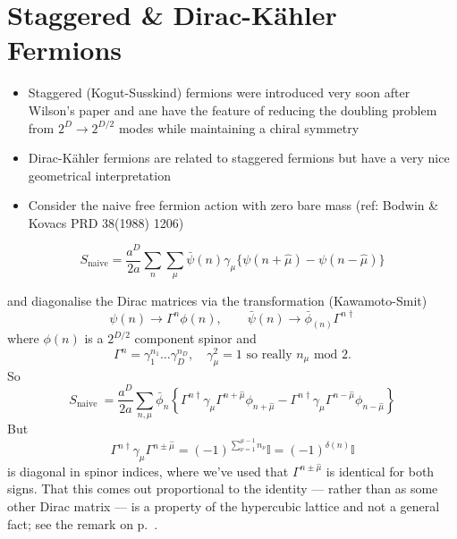 \section{Staggered \& Dirac-K\"ahler Fermions}

\begin{itemize}
  \item Staggered (Kogut-Susskind) fermions were introduced very soon after Wilson's paper and ane have the feature of reducing the doubling problem from \(2^{D} \rightarrow 2^{D / 2}\) modes while maintaining a chiral symmetry
  \item Dirac-Kähler fermions are related to staggered fermions but have a very nice geometrical interpretation
  \item Consider the naive free fermion action with zero bare mass  (ref: Bodwin \& Kovacs PRD 38(1988) 1206)
\end{itemize}

\begin{equation}
S_{\text{naive}}=\frac{a^{D}}{2 a} \sum_{n} \sum_{\mu} \bar{\psi}({n}) \gamma_{\mu}\{\psi(n+\hat{\mu})-\psi(n-\hat{\mu})\}
\end{equation}

and diagonalise the Dirac matrices via the transformation (Kawamoto-Smit)
\begin{equation}
\psi({n}) \rightarrow \Gamma^{n} \phi({n}),
\qquad \bar{\psi}({n}) \rightarrow \bar{\phi}_({n}) \Gamma^{n \dagger} 
\end{equation}
where $\phi({n})$ is a $2^{D / 2}$ component spinor  and
\begin{equation}
    \Gamma^n = \gamma_1^{n_1}\ldots \gamma_D^{n_D}, \quad \gamma^2_\mu = 1 \text{ so really }n_\mu \text{ mod }2.
\end{equation}
So
\begin{equation}
S_{\text {naive }} =\frac{a^{D}}{2 a} \sum_{n,\mu} \bar{\phi}_{n}\left\{\Gamma^{n \dagger} \gamma_{\mu} \Gamma^{n+\hat{\mu}} \phi_{n+\hat{\mu}}-\Gamma^{n \dagger} \gamma_{\mu} \Gamma^{n-\hat{\mu}} \phi_{n-\hat{\mu}}\right\}
\end{equation}
But
\begin{equation}
    \Gamma^{n \dagger} \gamma_\mu \Gamma^{n \pm \hat{\mu}} = (-1)^{\sum_{\nu = 1}^{\mu - 1}n_\nu} \mathbb{I} = (-1)^{\delta(n)}\mathbb{I}
\end{equation}
is diagonal in spinor indices, where we've used that $\Gamma^{n \pm \hat{\mu}}$ is identical for both signs.
That this comes out proportional to the identity --- rather than as some other
Dirac matrix --- is a property of the hypercubic lattice and not a general fact;
see the remark on p.~\pageref{rmk:kd-cubic}.

